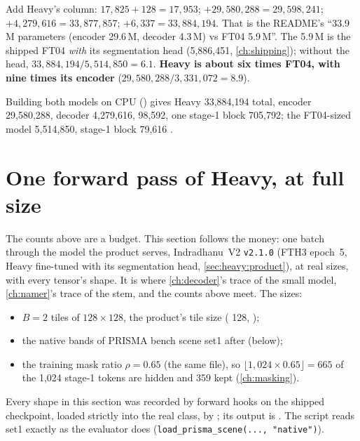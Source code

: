 Add Heavy's column: $17{,}825+128=17{,}953$; $+29{,}580{,}288=29{,}598{,}241$; $+4{,}279{,}616=33{,}877{,}857$;
$+6{,}337=33{,}884{,}194$. That is the README's ``33.9\,M parameters (encoder 29.6\,M, decoder 4.3\,M) vs FT04
5.9\,M''. The 5.9\,M is the shipped FT04 \emph{with} its segmentation head (5,886,451, \cref{ch:shipping});
without the head, $33{,}884{,}194/5{,}514{,}850=6.1$. \textbf{Heavy is about six times FT04, with nine times its
encoder} ($29{,}580{,}288/3{,}331{,}072=8.9$).

\begin{sourcenote}
Building both models on CPU () gives Heavy 33,884,194 total,
encoder 29,580,288, decoder 4,279,616,  98,592, one stage-1 block 705,792; the
FT04-sized model 5,514,850, stage-1 block 79,616 \tagC.
\end{sourcenote}

\section{One forward pass of Heavy, at full size}\label{sec:heavy:trace}

The counts above are a budget. This section follows the money: one batch through the model the product serves,
Indradhanu~V2 \texttt{v2.1.0} (FTH3 epoch~5, Heavy fine-tuned with its segmentation head, \cref{sec:heavy:product}),
at real sizes, with every tensor's shape. It is where \cref{ch:decoder}'s trace of the small model, \cref{ch:namer}'s
trace of the stem, and the counts above meet. The sizes:
\begin{itemize}
\item $B=2$ tiles of $128\times128$, the product's tile size ( 128,
  );
\item the native bands of PRISMA bench scene set1 after  (below);
\item the training mask ratio $\rho=0.65$ (the same file), so $\lfloor1{,}024\times0.65\rfloor=665$ of the 1,024
  stage-1 tokens are hidden and 359 kept (\cref{ch:masking}).
\end{itemize}
Every shape in this section was recorded by forward hooks on the shipped checkpoint, loaded strictly into the real
class, by ; its output is
 \tagC. The script reads set1 exactly as the evaluator does
(\lstinline!load_prisma_scene(..., "native")!).

